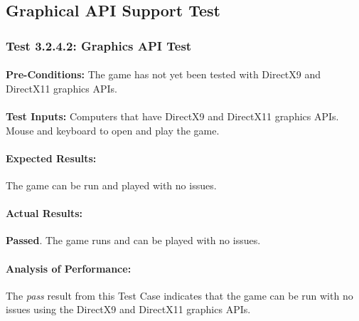 \documentclass{article}
\begin{document}
\subsection{Graphical API Support Test}
\subsubsection{Test 3.2.4.2: Graphics API Test }
    \paragraph{}\textbf{Pre-Conditions:} The game has not yet been tested with DirectX9 and DirectX11 graphics APIs.
    \paragraph{}\textbf{Test Inputs:} Computers that have DirectX9 and DirectX11 graphics APIs. Mouse and keyboard to open and play the game.
    \paragraph{Expected Results:} The game can be run and played with no issues.
    \paragraph{Actual Results:} \textbf{Passed}. The game runs and can be played with no issues.
    \paragraph{Analysis of Performance:} The \emph{pass} result from this Test Case indicates that the game can be run with no issues using the DirectX9 and DirectX11 graphics APIs.
\end{document}
